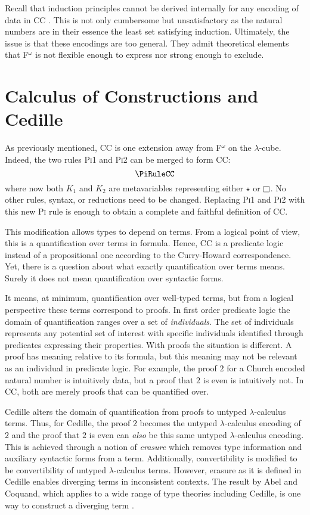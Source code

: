 Recall that induction principles cannot be derived internally for any encoding of data in CC \cite{geuvers2001_noind}.
This is not only cumbersome but unsatisfactory as the natural numbers are in their essence the least set satisfying induction.
Ultimately, the issue is that these encodings are too general.
They admit theoretical elements that F$^\omega$ is not flexible enough to express nor strong enough to exclude.

\section{Calculus of Constructions and Cedille}

As previously mentioned, CC is one extension away from F$^\omega$ on the $\lambda$-cube.
Indeed, the two rules \textsc{Pi1} and \textsc{Pi2} can be merged to form CC:
$$\PiRuleCC$$
where now both $K_1$ and $K_2$ are metavariables representing either $\star$ or $\kind$.
No other rules, syntax, or reductions need to be changed.
Replacing \textsc{Pi1} and \textsc{Pi2} with this new \textsc{Pi} rule is enough to obtain a complete and faithful definition of CC.

This modification allows types to depend on terms.
From a logical point of view, this is a quantification over terms in formula.
Hence, CC is a predicate logic instead of a propositional one according to the Curry-Howard correspondence.
Yet, there is a question about what exactly quantification over terms means.
Surely it does not mean quantification over syntactic forms.

It means, at minimum, quantification over well-typed terms, but from a logical perspective these terms correspond to proofs.
In first order predicate logic the domain of quantification ranges over a set of \textit{individuals}.
The set of individuals represents any potential set of interest with specific individuals identified through predicates expressing their properties.
With proofs the situation is different.
A proof has meaning relative to its formula, but this meaning may not be relevant as an individual in predicate logic.
For example, the proof $2$ for a Church encoded natural number is intuitively data, but a proof that $2$ is even is intuitively not.
In CC, both are merely proofs that can be quantified over.

Cedille alters the domain of quantification from proofs to untyped $\lambda$-calculus terms.
Thus, for Cedille, the proof $2$ becomes the untyped $\lambda$-calculus encoding of $2$ and the proof that $2$ is even can \textit{also} be this same untyped $\lambda$-calculus encoding.
This is achieved through a notion of \textit{erasure} which removes type information and auxiliary syntactic forms from a term.
Additionally, convertibility is modified to be convertibility of untyped $\lambda$-calculus terms.
However, erasure as it is defined in Cedille enables diverging terms in inconsistent contexts.
The result by Abel and Coquand, which applies to a wide range of type theories including Cedille, is one way to construct a diverging term \cite{abel2020_normalization}.

